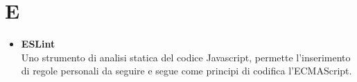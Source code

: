 \chapter{E} \label{E}
\begin{itemize}
	\item \textbf{ESLint}\\
	Uno strumento di analisi statica del codice Javascript, permette l'inserimento di regole personali da seguire e segue come principi di codifica l'ECMAScript.
\end{itemize}